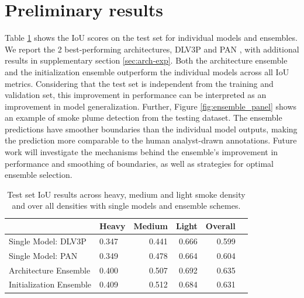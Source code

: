 \documentclass{article}
\begin{document}
\section{Preliminary results}
Table \ref{tab:results} shows the IoU scores on the test set for individual models and ensembles. We report the 2 best-performing architectures, DLV3P \citep{dlv3p} and PAN \citep{PAN}, with additional results in supplementary section \ref{sec:arch-exp}. Both the architecture ensemble and the initialization ensemble outperform the individual models across all IoU metrics. Considering that the test set is independent from the training and validation set, this improvement in performance can be interpreted as an improvement in model generalization. 
Further, Figure \ref{fig:ensemble_panel} shows an example of smoke plume detection from the testing dataset. The ensemble predictions have smoother boundaries than the individual model outputs, making the prediction more comparable to the human analyst-drawn annotations. Future work will investigate the mechanisms behind the ensemble's improvement in performance and smoothing of boundaries, as well as strategies for optimal ensemble selection.

\begin{table}[h]
    \centering
    \caption{Test set IoU results across heavy, medium and light smoke density and over all densities with single models and ensemble schemes.}
    \label{tab:results}
    \begin{tabular}{llrrr>{\bfseries}r}
        \hline
            &   Heavy &   Medium &   Light &   Overall \\
        \hline
        Single Model: DLV3P \citep{dlv3p} &   0.347 &     0.441 &  0.666 &      0.599  \\
        Single Model: PAN \citep{PAN} &  0.349 &     0.478 &  0.664 &      0.604 \\
        Architecture Ensemble &   0.400 &     0.507 &  0.692 &      0.635 \\ %
        Initialization Ensemble &  0.409 &     0.512 &  0.684 &      0.631 \\%
         \hline
    \end{tabular}
    \end{table}
\end{document}
